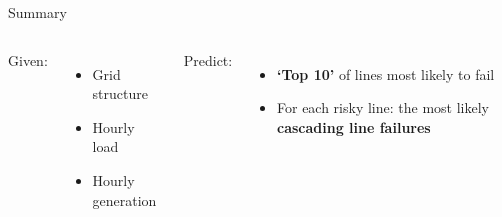 \documentclass[10pt]{beamer}
\begin{document}
{
\begin{frame}[noframenumbering]
\end{frame}
}

\begin{frame}{Summary}
    \begin{columns}[T,onlytextwidth]
    Given:
    \begin{itemize}
        \item Grid structure
        \item Hourly load
        \item Hourly generation
    \end{itemize}
    
    Predict:
    \begin{itemize}
        \item \textbf{`Top 10'} of lines most likely to fail
        \item For each risky line: the most likely \textbf{cascading line failures}
    \end{itemize}
    \end{columns}
\end{frame}

{
\begin{frame}[plain]
\end{frame}
}
\end{document}
